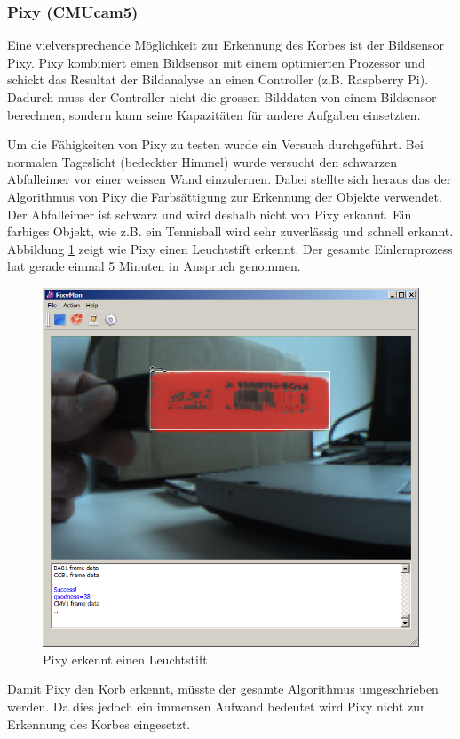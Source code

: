 \subsubsection{Pixy (CMUcam5)}

Eine vielversprechende Möglichkeit zur Erkennung des Korbes ist der Bildsensor Pixy. Pixy kombiniert einen Bildsensor mit einem optimierten Prozessor und schickt das Resultat der Bildanalyse an einen Controller (z.B. Raspberry Pi). Dadurch muss der Controller nicht die grossen Bilddaten von einem Bildsensor berechnen, sondern kann seine Kapazitäten für andere Aufgaben einsetzten.

Um die Fähigkeiten von Pixy zu testen wurde ein Versuch durchgeführt. Bei normalen Tageslicht (bedeckter Himmel) wurde versucht den schwarzen Abfalleimer vor einer
weissen Wand einzulernen. Dabei stellte sich heraus das der Algorithmus von Pixy die Farbsättigung zur
Erkennung der Objekte verwendet. Der Abfalleimer ist schwarz und wird deshalb nicht von Pixy erkannt. Ein
farbiges Objekt, wie z.B. ein Tennisball wird sehr zuverlässig und schnell erkannt. Abbildung \ref{fig:pixy_objekt} zeigt wie Pixy einen
Leuchtstift erkennt. Der gesamte Einlernprozess hat gerade einmal 5 Minuten in Anspruch genommen.

\begin{figure}[h!]
	\centering
	\includegraphics[width=0.7\linewidth]{../../fig/pixy_objekt}
	\caption{Pixy erkennt einen Leuchtstift}
	\label{fig:pixy_objekt}
\end{figure}

Damit Pixy den Korb erkennt, müsste der gesamte Algorithmus umgeschrieben werden. Da dies jedoch ein immensen Aufwand bedeutet wird Pixy nicht zur Erkennung des Korbes eingesetzt.